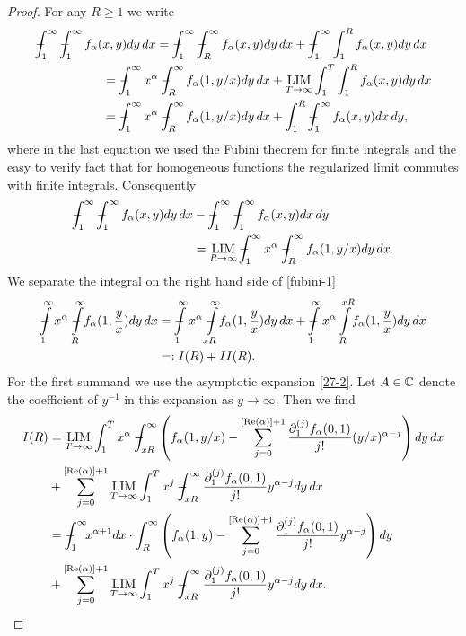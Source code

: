 \begin{proof}
For any $R\geq 1$ we write
\begin{equation}
\begin{split}
\regint_1^\infty \regint_1^\infty f_{\A}(&x,y) dy \, dx 
= \regint_1^\infty \regint_R^\infty f_{\A}(x,y) dy \, dx  
+ \regint_1^\infty \int_1^R f_{\A}(x,y) dy \, dx \\
&=  \regint_1^\infty x^\A \regint_R^\infty f_\A(1,y/x) dy \, dx 
+ \LIM_{T\to\infty} \int_1^T\int_1^R f_{\A}(x,y) dy \, dx \\
&=  \regint_1^\infty x^\A \regint_R^\infty f_\A(1,y/x) dy \, dx 
+ \int_1^R \regint_1^\infty f_{\A}(x,y) dx \, dy,
\end{split}
\end{equation}
where in the last equation we used the Fubini theorem for finite integrals 
and the easy to verify fact that for homogeneous functions the regularized limit commutes with finite integrals. 
Consequently
\begin{equation}
\label{fubini-1}
\begin{split}
\regint_1^\infty \regint_1^\infty f_{\A}(x,y) dy \, dx 
&- \regint_1^\infty \regint_1^\infty f_{\A}(x,y) dx \, dy \\
&= \LIM_{R\to \infty}\regint_1^\infty x^\A \regint_R^\infty f_\A(1,y/x) dy \, dx. 
\end{split}
\end{equation}
We separate the integral on the right hand side of \eqref{fubini-1}
\begin{equation*}
\begin{split}
\regint\limits_1^\infty x^\A \regint\limits_R^\infty \!f_\A(1,\frac{y}{x}) dy \, dx 
&= \regint\limits_1^\infty x^{\A} \regint\limits_{xR}^\infty \!f_\A(1,\frac{y}{x}) dy \, dx 
+ \regint\limits_1^\infty x^{\A} \int\limits_{R}^{xR} \!f_\A(1,\frac{y}{x}) dy \, dx 
\\&=:I(R) + II(R).
\end{split}
\end{equation*}
For the first summand we use the asymptotic expansion 
\eqref{27-2}. Let $A\in \mathbb{C}$ denote the coefficient of $y^{-1}$
in this expansion as $y\to \infty$. Then we find
\begin{equation}
\begin{split}
I(R) &= \LIM_{T\to\infty} \int_1^T x^{\A} \regint_{xR}^\infty \left(f_\A(1,y/x)-
\sum_{j=0}^{[\textup{Re}(\A)]+1}\frac{\partial_1^{(j)}f_\A(0,1)}{j!} (y/x)^{\A-j}\right) dy \, dx 
\\ &+ \sum_{j=0}^{[\textup{Re}(\A)]+1} \LIM_{T\to\infty} \int_1^T x^{j} \regint_{xR}^\infty  
\frac{\partial_1^{(j)}f_\A(0,1)}{j!} y^{\A-j} dy \, dx \\
&=  \regint_1^\infty \!\!x^{\A+1} dx \cdot \int_{R}^\infty\left(f_\A(1,y)-
\sum_{j=0}^{[\textup{Re}(\A)]+1}\frac{\partial_1^{(j)}f_\A(0,1)}{j!} y^{\A-j}\right) dy \\
&+ \sum_{j=0}^{[\textup{Re}(\A)]+1} \LIM_{T\to\infty} \int_1^T x^{j} \regint_{xR}^\infty  
\frac{\partial_1^{(j)}f_\A(0,1)}{j!} y^{\A-j} dy \, dx. 
\end{split}
\end{equation}


\end{proof}
